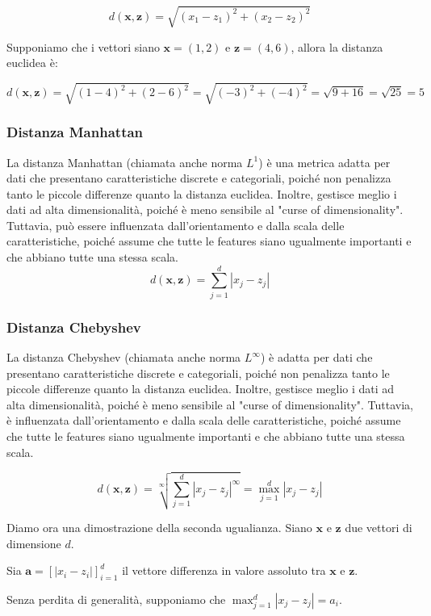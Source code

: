 \[
d(\mathbf{x}, \mathbf{z}) = \sqrt{(x_1 - z_1)^2 + (x_2 - z_2)^2}
\]

Supponiamo che i vettori siano \(\mathbf{x} = (1, 2)\) e \(\mathbf{z} = (4, 6)\), allora la distanza euclidea è:

\[
d(\mathbf{x}, \mathbf{z}) = \sqrt{(1 - 4)^2 + (2 - 6)^2} = \sqrt{(-3)^2 + (-4)^2} = \sqrt{9 + 16} = \sqrt{25} = 5
\]
    

\subsubsection{Distanza Manhattan} La distanza Manhattan (chiamata anche norma $L^1$) 
    è una metrica adatta per dati che presentano caratteristiche discrete e 
    categoriali, poiché non penalizza tanto le piccole differenze 
    quanto la distanza euclidea. Inoltre, gestisce meglio i dati ad alta 
    dimensionalità, poiché è meno sensibile al "curse of dimensionality". 
    Tuttavia, può essere influenzata dall'orientamento e dalla scala delle 
    caratteristiche, poiché assume che tutte le features siano ugualmente 
    importanti e che abbiano tutte una stessa scala.
    \[
    d(\mathbf{x}, \mathbf{z}) = \sum_{j=1}^d |x_j - z_j|
    \]

\subsubsection{Distanza Chebyshev} La distanza Chebyshev (chiamata anche norma $L^{\infty}$) 
    è adatta per dati che presentano caratteristiche discrete e 
    categoriali, poiché non penalizza tanto le piccole differenze 
    quanto la distanza euclidea. Inoltre, gestisce meglio i dati ad alta 
    dimensionalità, poiché è meno sensibile al "curse of dimensionality". 
    Tuttavia, è influenzata dall'orientamento e dalla scala delle 
    caratteristiche, poiché assume che tutte le features siano ugualmente 
    importanti e che abbiano tutte una stessa scala.

    \[
    d(\mathbf{x}, \mathbf{z}) = \sqrt[\infty]{\sum_{j=1}^d |x_j - z_j|^{\infty}} = \max_{j=1}^d |x_j - z_j|
    \]

    Diamo ora una dimostrazione della seconda ugualianza. Siano $\mathbf x$ e $\mathbf z$ due vettori di dimensione $d$.
    
    Sia $\mathbf a = [|x_i - z_i|]^{d}_{i=1}$ il vettore differenza in valore assoluto tra $\mathbf x$ e $\mathbf z$.
    
    Senza perdita di generalità, supponiamo che $\max_{j=1}^d |x_j - z_j| = a_i$.
    
